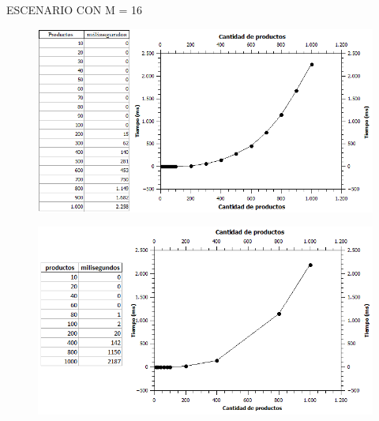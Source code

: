 \documentclass[10pt,a4paper]{article}
\begin{document}
\newpage\indent ESCENARIO CON M = 16
	\begin{figure}[h]
		\begin{center}
		   \includegraphics[scale=0.50]{experimentos/random/graficos/16.png}
		\end{center}
	\end{figure}
	\begin{figure}[h]
		\begin{center}
		   \includegraphics[scale=0.50]{sincota/graficos/16.png}
		\end{center}
	\end{figure}
\end{document}
